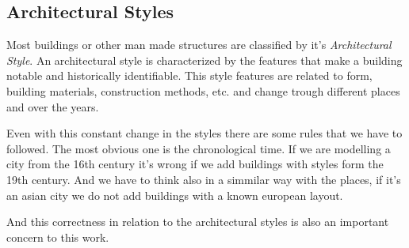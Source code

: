 

\subsection{Architectural Styles} %
\label{sub:architectural_styles}

Most buildings or other man made structures are classified by it's \emph{Architectural Style}. An architectural style is characterized by the features that make a building notable and historically identifiable. This style features are related to form, building materials, construction methods, etc. and change trough different places and over the years. 

Even with this constant change in the styles there are some rules that we have to followed. The most obvious one is the chronological time.
If we are modelling a city from the 16th century it's wrong if we add buildings with styles form the 19th century. And we have to think also in a simmilar way with the places, if it's an asian city we do not add buildings with a known european layout.

And this correctness in relation to the architectural styles is also an important concern to this work.

